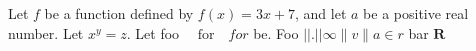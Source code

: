 \documentclass{article}
\begin{document}
Let $f$ be a function defined by $f(x) = 3x+7$, and
let $a$ be a positive real number.
Let $x^{y} = z$.
Let foo $\quad\text{for}\quad for$ be.
Foo $|| . || \infty{} \| v \| a \in r$ bar
$\mathbf{R}$
\end{document}
